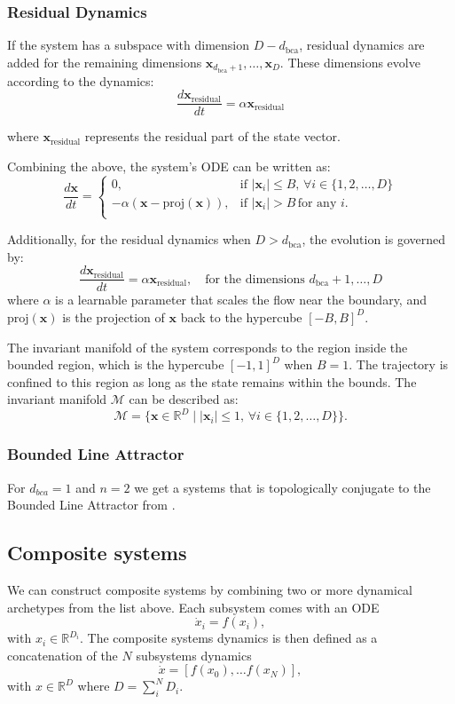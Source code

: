 \documentclass{article}
\theoremstyle{definition} \newtheorem{definition}{Definition}  \newtheorem{example}{Example}
\theoremstyle{remark} \newtheorem{remark}{Remark}
\newcounter{ct}
\newcommand{\field}[1]{\ensuremath{\mathbb{#1}}}
\newcommand{\reals}{\field{R}}
\begin{document}
\subsubsection*{Residual Dynamics}
If the system has a subspace with dimension \( D - d_{\text{bca}} \), residual dynamics are added for the remaining dimensions \( \mathbf{x}_{d_{\text{bca}}+1}, \dots, \mathbf{x}_D \). These dimensions evolve according to the dynamics:
\[
\frac{d \mathbf{x}_{\text{residual}}}{dt} = \alpha \mathbf{x}_{\text{residual}}
\]

where \( \mathbf{x}_{\text{residual}} \) represents the residual part of the state vector.

Combining the above, the system's ODE can be written as:
\[
\frac{d \mathbf{x}}{dt} =
\begin{cases}
0, & \text{if } |\mathbf{x}_i| \leq B, \, \forall i \in \{1, 2, \dots, D\} \\
-\alpha (\mathbf{x} - \text{proj}(\mathbf{x})), & \text{if } |\mathbf{x}_i| > B \, \text{for any } i. \\
\end{cases}
\]

Additionally, for the residual dynamics when \( D > d_{\text{bca}} \), the evolution is governed by:
\[
\frac{d \mathbf{x}_{\text{residual}}}{dt} = \alpha \mathbf{x}_{\text{residual}}, \quad \text{for the dimensions } d_{\text{bca}}+1, \dots, D
\]
where \( \alpha \) is a learnable parameter that scales the flow near the boundary, and \( \text{proj}(\mathbf{x}) \) is the projection of \( \mathbf{x} \) back to the hypercube \( [-B, B]^D \).


The invariant manifold of the system corresponds to the region inside the bounded region, which is the hypercube \( [-1, 1]^D \) when \( B = 1 \).
The trajectory is confined to this region as long as the state remains within the bounds.
The invariant manifold \( \mathcal{M} \) can be described as:
\[
\mathcal{M} = \{ \mathbf{x} \in \mathbb{R}^D \mid |\mathbf{x}_i| \leq 1, \, \forall i \in \{1, 2, \dots, D\} \}.
\]


\subsubsection{Bounded Line Attractor}
For $d_{bca}=1$ and $n=2$ we get a systems that is topologically conjugate to the Bounded Line Attractor from \citep{Sagodi2024a}.



\subsection{Composite systems}\label{sec:composite}
We can construct composite systems by combining two or more dynamical archetypes from the list above.
Each subsystem comes with an ODE
\begin{equation}
\dot x_i = f(x_i),
\end{equation}
with $x_i\in \reals^{D_i}$.
The composite systems dynamics is then defined as a concatenation of the $N$ subsystems dynamics
\begin{equation}
\dot x = [f(x_0), \dots f(x_N)],
\end{equation}
with $x\in \reals^{D}$ where $D=\sum_i^N D_i$.
\end{document}
